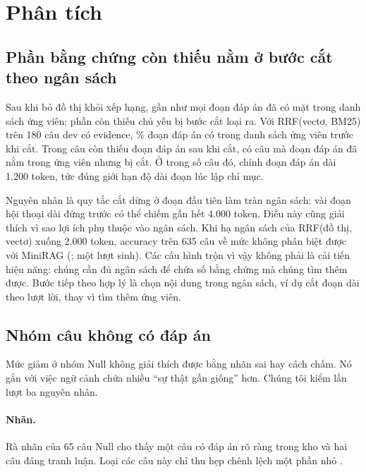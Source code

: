 \section{Phân tích}\label{sec:analysis}

\subsection{Phần bằng chứng còn thiếu nằm ở bước cắt theo ngân sách}\label{sec:residual}
Sau khi bỏ đồ thị khỏi xếp hạng, gần như mọi đoạn đáp án đã có mặt trong danh sách ứng viên; phần còn thiếu chủ yếu bị bước cắt loại ra.
Với RRF(vectơ, BM25) trên 180 câu dev có evidence, \retCandVK\% đoạn đáp án có trong danh sách ứng viên trước khi cắt.
Trong \failVK{} câu còn thiếu đoạn đáp án sau khi cắt, có \cutFailVK{} câu mà đoạn đáp án đã nằm trong ứng viên nhưng bị cắt.
Ở \longAnsCut{} trong số \cutFailVK{} câu đó, chính đoạn đáp án dài 1.200 token, tức đúng giới hạn độ dài đoạn lúc lập chỉ mục.

Nguyên nhân là quy tắc cắt dừng ở đoạn đầu tiên làm tràn ngân sách: vài đoạn hội thoại dài đứng trước có thể chiếm gần hết 4.000 token.
Điều này cũng giải thích vì sao lợi ích phụ thuộc vào ngân sách.
Khi hạ ngân sách của RRF(đồ thị, vectơ) xuống 2.000 token, accuracy trên 635 câu về mức không phân biệt được với MiniRAG (\budgetTwoK; một lượt sinh).
Các cấu hình trộn vì vậy không phải là cải tiến hiệu năng: chúng cần đủ ngân sách để chứa số bằng chứng mà chúng tìm thêm được.
Bước tiếp theo hợp lý là chọn nội dung trong ngân sách, ví dụ cắt đoạn dài theo lượt lời, thay vì tìm thêm ứng viên.

\subsection{Nhóm câu không có đáp án}\label{sec:null}
Mức giảm ở nhóm Null không giải thích được bằng nhãn sai hay cách chấm. Nó gắn với việc ngữ cảnh chứa nhiều ``sự thật gần giống'' hơn.
Chúng tôi kiểm lần lượt ba nguyên nhân.

\paragraph{Nhãn.}
Rà nhãn của 65 câu Null cho thấy một câu có đáp án rõ ràng trong kho và hai câu đáng tranh luận.
Loại các câu này chỉ thu hẹp chênh lệch một phần nhỏ .

